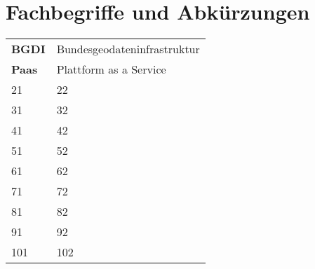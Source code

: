 \section{Fachbegriffe und Abkürzungen}
\begin{tabular}{ll}
    \textbf{BGDI} & Bundesgeodateninfrastruktur\\
	\textbf{Paas} & Plattform as a Service\\
	21 & 22\\
	31 & 32\\
	41 & 42\\
	51 & 52\\
	61 & 62\\
	71 & 72\\
	81 & 82\\
	91 & 92\\
	101 & 102\\
\end{tabular}
